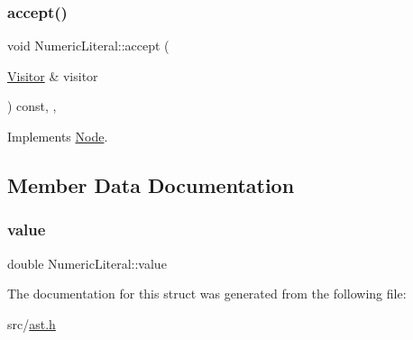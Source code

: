 \subsubsection{\texorpdfstring{accept()}{accept()}}
{\footnotesize\ttfamily void Numeric\+Literal\+::accept (\begin{DoxyParamCaption}\item[{\hyperlink{struct_visitor}{Visitor} \&}]{visitor }\end{DoxyParamCaption}) const\hspace{0.3cm}{\ttfamily [inline]}, {\ttfamily [override]}, {\ttfamily [virtual]}}



Implements \hyperlink{struct_node_a10bd7af968140bbf5fa461298a969c71}{Node}.



\subsection{Member Data Documentation}
\mbox{\label{struct_numeric_literal_adeef869e11ca886648a0ccb723dc6639}} 
\subsubsection{\texorpdfstring{value}{value}}
{\footnotesize\ttfamily double Numeric\+Literal\+::value}



The documentation for this struct was generated from the following file\+:\begin{DoxyCompactItemize}
\item 
src/\hyperlink{ast_8h}{ast.\+h}\end{DoxyCompactItemize}
